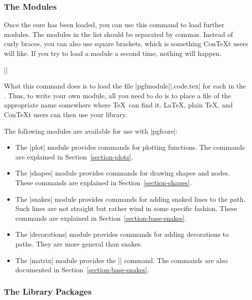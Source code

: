 \subsubsection{The Modules}

\begin{command}{\usepgflibrary{}}
  Once the core has been loaded, you can use this command to load
  further modules. The modules in the  list should
  be separated by commas. Instead of curly braces, you can also
  use square brackets, which is something Con\TeX t users will
  like. If you try to load a module a second time, nothing will
  happen. 

  \example ||

  What this command does is to load the file
  |pgfmodule||.code.tex| for each  in
  the . Thus, to write your own module,
  all you need to do is to place a file of the appropriate name
  somewhere where \TeX\ can find it. \LaTeX, plain \TeX, and Con\TeX t
  users can then use your library.
\end{command}

The following modules are available for use with |pgfcore|:

\begin{itemize}
\item The |plot| module provides commands for plotting functions.  The
  commands are explained in Section~\ref{section-plots}.
\item The |shapes| module provides commands for drawing shapes and
  nodes. These commands are explained in
  Section~\ref{section-shapes}. 
\item The |snakes| module provides commands for adding snaked lines to
  the path. Such lines are not straight but rather wind in some
  specific fashion. These commands are explained in
  Section~\ref{section-base-snakes}. 
\item The |decorations| module provides commands for adding
  decorations to paths. They are more general than snakes.
\item The |matrix| module provides the |\pgfmatrix| command. The
  commands are also documented in Section~\ref{section-base-snakes}.  
\end{itemize}



\subsubsection{The Library Packages}

